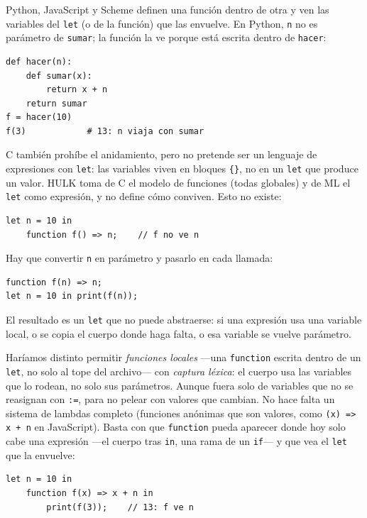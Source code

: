 \documentclass[11pt,a4paper]{article}
\begin{document}
Python, JavaScript y Scheme definen una función dentro de otra y ven las variables del \texttt{let} (o de la función) que las envuelve. En Python, \texttt{n} no es parámetro de \texttt{sumar}; la función la ve porque está escrita dentro de \texttt{hacer}:

\begin{lstlisting}[language={},numbers=none]
def hacer(n):
    def sumar(x):
        return x + n
    return sumar
f = hacer(10)
f(3)            # 13: n viaja con sumar
\end{lstlisting}

C también prohíbe el anidamiento, pero no pretende ser un lenguaje de expresiones con \texttt{let}: las variables viven en bloques \texttt{\{\}}, no en un \texttt{let} que produce un valor. HULK toma de C el modelo de funciones (todas globales) y de ML el \texttt{let} como expresión, y no define cómo conviven. Esto no existe:

\begin{lstlisting}[language={},numbers=none]
let n = 10 in
    function f() => n;    // f no ve n
\end{lstlisting}

Hay que convertir \texttt{n} en parámetro y pasarlo en cada llamada:

\begin{lstlisting}[language={},numbers=none]
function f(n) => n;
let n = 10 in print(f(n));
\end{lstlisting}

El resultado es un \texttt{let} que no puede abstraerse: si una expresión usa una variable local, o se copia el cuerpo donde haga falta, o esa variable se vuelve parámetro.

Haríamos distinto permitir \emph{funciones locales} ---una \texttt{function} escrita dentro de un \texttt{let}, no solo al tope del archivo--- con \emph{captura léxica}: el cuerpo usa las variables que lo rodean, no solo sus parámetros. Aunque fuera solo de variables que no se reasignan con \texttt{:=}, para no pelear con valores que cambian. No hace falta un sistema de lambdas completo (funciones anónimas que son valores, como \texttt{(x) => x + n} en JavaScript). Basta con que \texttt{function} pueda aparecer donde hoy solo cabe una expresión ---el cuerpo tras \texttt{in}, una rama de un \texttt{if}--- y que vea el \texttt{let} que la envuelve:

\begin{lstlisting}[language={},numbers=none]
let n = 10 in
    function f(x) => x + n in
        print(f(3));    // 13: f ve n
\end{lstlisting}
\end{document}
